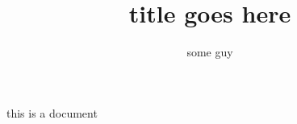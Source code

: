 \documentclass{article}
\title{title goes here}
\author{some guy}
\begin{document}
this is a document
\end{document}
